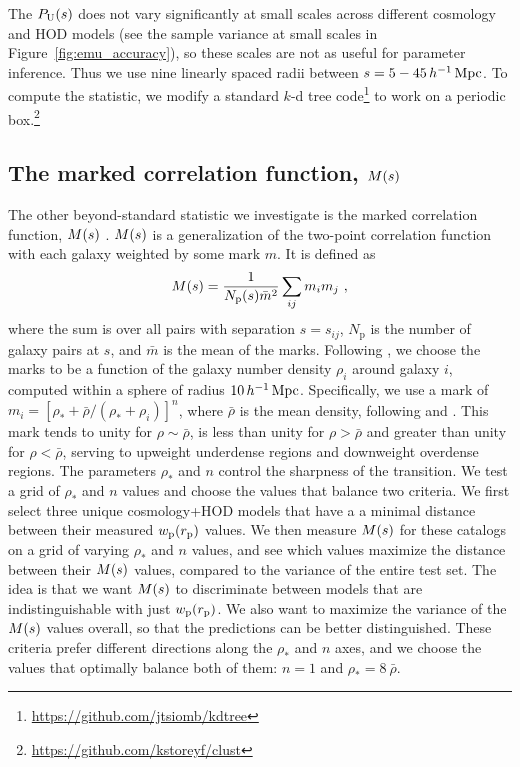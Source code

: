 The $P_\mathrm{U}(s)$ does not vary significantly at small scales across different cosmology and HOD models (see the sample variance at small scales in Figure~\ref{fig:emu_accuracy}), so these scales are not as useful for parameter inference.
Thus we use nine linearly spaced radii between $s = 5-45 \, h^{-1}\,\mathrm{Mpc}$.
To compute the statistic, we modify a standard $k$-d tree code\footnote{\url{https://github.com/jtsiomb/kdtree}} to work on a periodic box.\footnote{\url{https://github.com/kstoreyf/clust}} 

\subsection{The marked correlation function, \texorpdfstring{$M(s)$}{M(s}}
\label{sec:mcf}

The other beyond-standard statistic we investigate is the marked correlation function, $M(s)$ \citep{Sheth2004}.
$M(s)$ is a generalization of the two-point correlation function with each galaxy weighted by some mark $m$.
It is defined as 
\begin{equation}
	M(s) = \frac{1}{N_\mathrm{p}(s) \bar{m}^2} \sum_{ij} m_i m_j ~,  
\end{equation}
where the sum is over all pairs with separation $s = s_{ij}$, $N_\mathrm{p}$ is the number of galaxy pairs at $s$, and $\bar{m}$ is the mean of the marks.
Following \cite{WhitePadmanabhan2009}, we choose the marks to be a function of the galaxy number density $\rho_i$ around  galaxy $i$, computed within a sphere of radius $10 \, h^{-1}\,\mathrm{Mpc}$.
Specifically, we use a mark of $m_i = [\rho_* + \bar{\rho}/(\rho_* + \rho_i)]^n$, where $\bar{\rho}$ is the mean density, following \cite{White2016} and \cite{Satpathy2019}. 
This mark tends to unity for $\rho \sim \bar{\rho}$, is less than unity for $\rho > \bar{\rho}$ and greater than unity for $\rho < \bar{\rho}$, serving to upweight underdense regions and downweight overdense regions.
The parameters $\rho_*$ and $n$ control the sharpness of the transition.
We test a grid of  $\rho_*$ and $n$ values and choose the values that balance two criteria.
We first select three unique cosmology+HOD models that have a a minimal distance between their measured $w_\mathrm{p}(r_\mathrm{p})$ values.
We then measure $M(s)$ for these catalogs on a grid of varying $\rho_*$ and $n$ values, and see which values maximize the distance between their $M(s)$ values, compared to the variance of the entire test set.
The idea is that we want $M(s)$ to discriminate between models that are indistinguishable with just $w_\mathrm{p}(r_\mathrm{p})$.
We also want to maximize the variance of the $M(s)$ values overall, so that the predictions can be better distinguished.
These criteria prefer different directions along the $\rho_*$ and $n$ axes, and we choose the values that optimally balance both of them: $n=1$ and $\rho_*=8 \: \bar{\rho}$.

